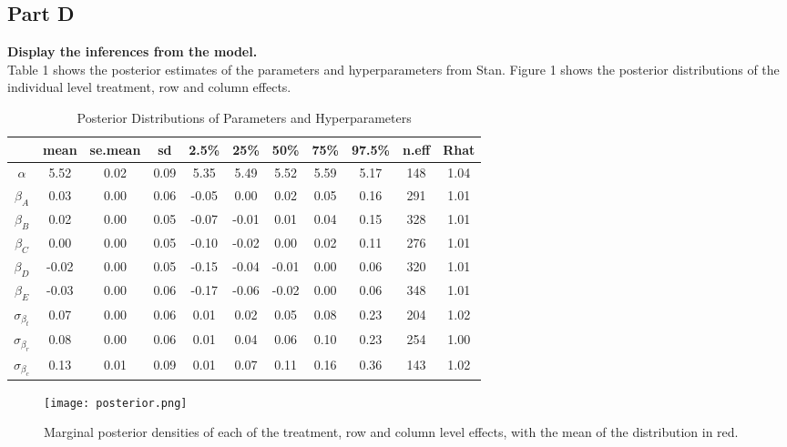 \documentclass{article}
\begin{document}
\subsection{Part D}
\textbf{Display the inferences from the model.}\\
Table 1 shows the posterior estimates of the parameters and hyperparameters from Stan. Figure 1 shows the posterior distributions of the individual level treatment, row and column effects.
\begin{table} [htbp]
\caption {Posterior Distributions of Parameters and Hyperparameters}
\vspace{2mm}
\def\arraystretch{1.5}
\centering \begin{tabular}{c c c c c c c c c c c} 
\hline\hline 
\vspace{1mm}
 & mean & se.mean  &  sd   & 2.5\%  &  25\% &   50\% &   75\% & 97.5\% & n.eff & Rhat \\  [0.5ex] \hline
$\alpha$    		&   	5.52  &  0.02  & 0.09  &  5.35  &  5.49  &  5.52  &  5.59  &  5.17  & 148 & 1.04 \\
$\beta_A$    		&   	0.03  &  0.00  & 0.06  &  -0.05  &  0.00  &  0.02  &  0.05  &  0.16  & 291 & 1.01 \\
$\beta_B$ 		& 0.02 &   0.00 &0.05& -0.07 &-0.01&  0.01 & 0.04 & 0.15  & 328 &1.01 \\
$\beta_C$    	&	0.00 &   0.00 &0.05 &-0.10& -0.02&  0.00 & 0.02 & 0.11 &  276 &1.01\\
$\beta_D$    	&-0.02 &   0.00 &0.05 &-0.15 &-0.04 &-0.01 & 0.00 & 0.06 &  320 &1.01\\	
$\beta_E$     	&-0.03 &   0.00 &0.06& -0.17 &-0.06 &-0.02  &0.00 & 0.06  & 348 &1.01	 \\
$\sigma_{\beta_{t}}$   &  0.07 &   0.00& 0.06 & 0.01 & 0.02 & 0.05 & 0.08 & 0.23  & 204 &1.02\\	
$\sigma_{\beta_{r}}$  &0.08 &   0.00& 0.06 & 0.01&  0.04 & 0.06 & 0.10&  0.23&   254 &1.00  \\
$\sigma_{\beta_{c}}$  & 0.13  &  0.01& 0.09 & 0.01&  0.07 & 0.11 & 0.16 & 0.36 &  143 &1.02 \\
\hline 
\end{tabular}
\end{table}
 \begin{figure}[H]
\centering
\texttt{[image: posterior.png]}
\caption{Marginal posterior densities of each of the treatment, row and column level effects, with the mean of the distribution in red.}
\label{deltat}
\end{figure}
\end{document}
